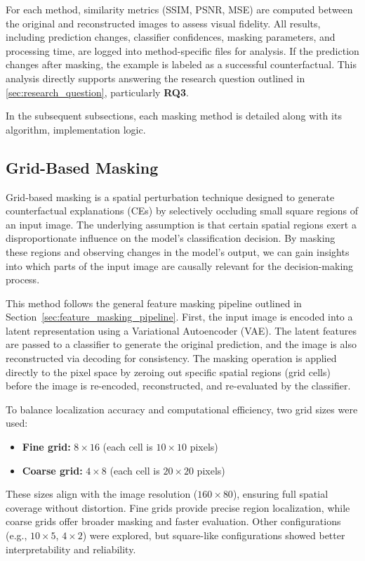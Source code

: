 For each method, similarity metrics (SSIM, PSNR, MSE) are computed between the original and reconstructed images to assess visual fidelity. All results, including prediction changes, classifier confidences, masking parameters, and processing time, are logged into method-specific files for analysis. If the prediction changes after masking, the example is labeled as a successful counterfactual. This analysis directly supports answering the research question outlined in \cref{sec:research_question}, particularly \textbf{RQ3}.


In the subsequent subsections, each masking method is detailed along with its algorithm, implementation logic.
 

\subsection{Grid-Based Masking} \label{sec:grid_based_masking}

Grid-based masking is a spatial perturbation technique designed to generate counterfactual explanations (CEs) by selectively occluding small square regions of an input image. The underlying assumption is that certain spatial regions exert a disproportionate influence on the model’s classification decision. By masking these regions and observing changes in the model’s output, we can gain insights into which parts of the input image are causally relevant for the decision-making process.

This method follows the general feature masking pipeline outlined in Section~\ref{sec:feature_masking_pipeline}. First, the input image is encoded into a latent representation using a Variational Autoencoder (VAE). The latent features are passed to a classifier to generate the original prediction, and the image is also reconstructed via decoding for consistency. The masking operation is applied directly to the pixel space by zeroing out specific spatial regions (grid cells) before the image is re-encoded, reconstructed, and re-evaluated by the classifier.

To balance localization accuracy and computational efficiency, two grid sizes were used:
\begin{itemize}
\item \textbf{Fine grid:} $8 \times 16$ (each cell is $10 \times 10$ pixels)
\item \textbf{Coarse grid:} $4 \times 8$ (each cell is $20 \times 20$ pixels)
\end{itemize}
These sizes align with the image resolution ($160 \times 80$), ensuring full spatial coverage without distortion. Fine grids provide precise region localization, while coarse grids offer broader masking and faster evaluation. Other configurations (e.g., $10 \times 5$, $4 \times 2$) were explored, but square-like configurations showed better interpretability and reliability.

